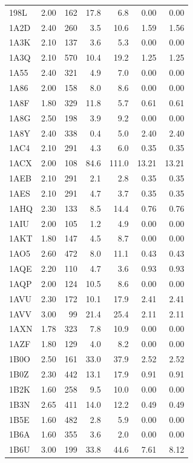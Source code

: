 \begin{longtable}{lrrrrrr}
198L & 2.00 & 162 & 17.8 & 6.8 & 0.00 & 0.00 \\
1A2D & 2.40 & 260 & 3.5 & 10.6 & 1.59 & 1.56 \\
1A3K & 2.10 & 137 & 3.6 & 5.3 & 0.00 & 0.00 \\
1A3Q & 2.10 & 570 & 10.4 & 19.2 & 1.25 & 1.25 \\
1A55 & 2.40 & 321 & 4.9 & 7.0 & 0.00 & 0.00 \\
1A86 & 2.00 & 158 & 8.0 & 8.6 & 0.00 & 0.00 \\
1A8F & 1.80 & 329 & 11.8 & 5.7 & 0.61 & 0.61 \\
1A8G & 2.50 & 198 & 3.9 & 9.2 & 0.00 & 0.00 \\
1A8Y & 2.40 & 338 & 0.4 & 5.0 & 2.40 & 2.40 \\
1AC4 & 2.10 & 291 & 4.3 & 6.0 & 0.35 & 0.35 \\
1ACX & 2.00 & 108 & 84.6 & 111.0 & 13.21 & 13.21 \\
1AEB & 2.10 & 291 & 2.1 & 2.8 & 0.35 & 0.35 \\
1AES & 2.10 & 291 & 4.7 & 3.7 & 0.35 & 0.35 \\
1AHQ & 2.30 & 133 & 8.5 & 14.4 & 0.76 & 0.76 \\
1AIU & 2.00 & 105 & 1.2 & 4.9 & 0.00 & 0.00 \\
1AKT & 1.80 & 147 & 4.5 & 8.7 & 0.00 & 0.00 \\
1AO5 & 2.60 & 472 & 8.0 & 11.1 & 0.43 & 0.43 \\
1AQE & 2.20 & 110 & 4.7 & 3.6 & 0.93 & 0.93 \\
1AQP & 2.00 & 124 & 10.5 & 8.6 & 0.00 & 0.00 \\
1AVU & 2.30 & 172 & 10.1 & 17.9 & 2.41 & 2.41 \\
1AVV & 3.00 & 99 & 21.4 & 25.4 & 2.11 & 2.11 \\
1AXN & 1.78 & 323 & 7.8 & 10.9 & 0.00 & 0.00 \\
1AZF & 1.80 & 129 & 4.0 & 8.2 & 0.00 & 0.00 \\
1B0O & 2.50 & 161 & 33.0 & 37.9 & 2.52 & 2.52 \\
1B0Z & 2.30 & 442 & 13.1 & 17.9 & 0.91 & 0.91 \\
1B2K & 1.60 & 258 & 9.5 & 10.0 & 0.00 & 0.00 \\
1B3N & 2.65 & 411 & 14.0 & 12.2 & 0.49 & 0.49 \\
1B5E & 1.60 & 482 & 2.8 & 5.9 & 0.00 & 0.00 \\
1B6A & 1.60 & 355 & 3.6 & 2.0 & 0.00 & 0.00 \\
1B6U & 3.00 & 199 & 33.8 & 44.6 & 7.61 & 8.12 \\

\end{longtable}
